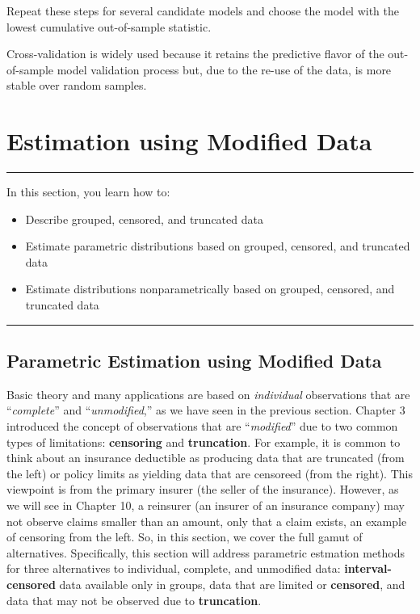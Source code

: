 \documentclass[]{book}
\providecommand{\tightlist}{%
  \setlength{\itemsep}{0pt}\setlength{\parskip}{0pt}}
\theoremstyle{definition}
\theoremstyle{definition}
\theoremstyle{definition}
\theoremstyle{remark}
\begin{document}
Repeat these steps for several candidate models and choose the model
with the lowest cumulative out-of-sample statistic.

Cross-validation is widely used because it retains the predictive flavor
of the out-of-sample model validation process but, due to the re-use of
the data, is more stable over random samples.

\section{Estimation using Modified Data}\label{S:MS:ModifiedData}

\begin{center}\rule{0.5\linewidth}{\linethickness}\end{center}

In this section, you learn how to:

\begin{itemize}
\tightlist
\item
  Describe grouped, censored, and truncated data
\item
  Estimate parametric distributions based on grouped, censored, and
  truncated data
\item
  Estimate distributions nonparametrically based on grouped, censored,
  and truncated data
\end{itemize}

\begin{center}\rule{0.5\linewidth}{\linethickness}\end{center}

\subsection{Parametric Estimation using Modified
Data}\label{parametric-estimation-using-modified-data}

Basic theory and many applications are based on \emph{individual}
observations that are ``\emph{complete}'' and ``\emph{unmodified},'' as
we have seen in the previous section. Chapter 3 introduced the concept
of observations that are ``\emph{modified}'' due to two common types of
limitations: \textbf{censoring} and \textbf{truncation}. For example, it
is common to think about an insurance deductible as producing data that
are truncated (from the left) or policy limits as yielding data that are
censoreed (from the right). This viewpoint is from the primary insurer
(the seller of the insurance). However, as we will see in Chapter 10, a
reinsurer (an insurer of an insurance company) may not observe claims
smaller than an amount, only that a claim exists, an example of
censoring from the left. So, in this section, we cover the full gamut of
alternatives. Specifically, this section will address parametric
estmation methods for three alternatives to individual, complete, and
unmodified data: \textbf{interval-censored} data available only in
groups, data that are limited or \textbf{censored}, and data that may
not be observed due to \textbf{truncation}.
\end{document}
